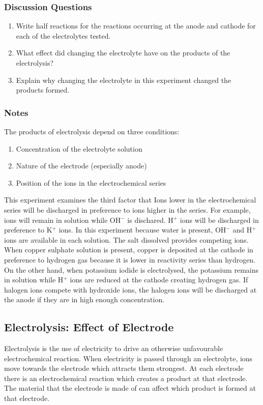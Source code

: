 \subsubsection*{Discussion Questions}
\begin{enumerate}
\item{Write half reactions for the reactions occurring at the anode and cathode for each of the electrolytes tested.}
\item{What effect did changing the electrolyte have on the products of the electrolysis?}
\item{Explain why changing the electrolyte in this experiment changed the products formed.}
\end{enumerate}

\subsubsection*{Notes}
The products of electrolysis depend on three conditions:
\begin{enumerate}
\item Concentration of the electrolyte solution
\item Nature of the electrode (especially anode)
\item Position of the ions in the electrochemical series
\end{enumerate}
This experiment examines the third factor that Ions lower in the electrochemical series will be discharged in preference to ions higher in the series. For example,  ions will remain in solution while OH$^{-}$ is dischared. H$^{+}$ ions will be discharged in preference to K$^{+}$ ions.
In this experiment because water is present, OH$^{-}$ and H$^{+}$ ions are available in each solution. The salt dissolved provides competing ions. When copper sulphate solution is present, copper is deposited at the cathode in preference to hydrogen gas because it is lower in reactivity series than hydrogen. On the other hand, when potassium iodide is electrolysed, the potassium remains in solution while H$^{+}$ ions are reduced at the cathode creating hydrogen gas.
If halogen ions compete with hydroxide ions, the halogen ions will be discharged at the anode if they are in high enough concentration.

\subsection{Electrolysis: Effect of Electrode}

Electrolysis is the use of electricity to drive an otherwise unfavourable electrochemical reaction. When electricity is passed through an electrolyte, ions move towards the electrode which attracts them strongest. At each electrode there is an electrochemical reaction which creates a product at that electrode. The material that the electrode is made of can affect which product is formed at that electrode.

